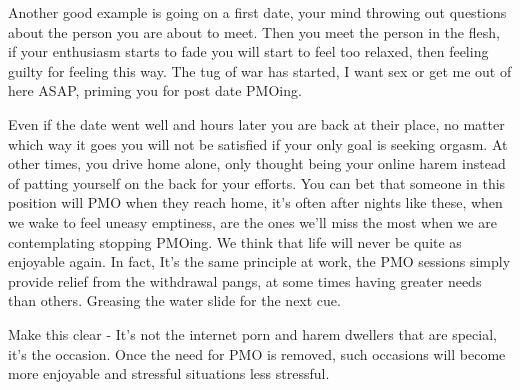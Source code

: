 \documentclass[easypeasy.tex]{subfiles}
\begin{document}
Another good example is going on a first date, your mind throwing out questions about the person you are about to meet. Then you meet the person in the flesh, if your enthusiasm starts to fade you will start to feel too relaxed, then feeling guilty for feeling this way. The tug of war has started, I want sex or get me out of here ASAP, priming you for post date PMOing.

Even if the date went well and hours later you are back at their place, no matter which way it goes you will not be satisfied if your only goal is seeking orgasm. At other times, you drive home alone, only thought being your online harem instead of patting yourself on the back for your efforts. You can bet that someone in this position will PMO when they reach home, it's often after nights like these, when we wake to feel uneasy emptiness, are the ones we'll miss the most when we are contemplating stopping PMOing. We think that life will never be quite as enjoyable again. In fact, It's the same principle at work, the PMO sessions simply provide relief from the withdrawal pangs, at some times having greater needs than others. Greasing the water slide for the next cue.

Make this clear - It's not the internet porn and harem dwellers that are special, it's the occasion. Once the need for PMO is removed, such occasions will become more enjoyable and stressful situations less stressful.
\end{document}
